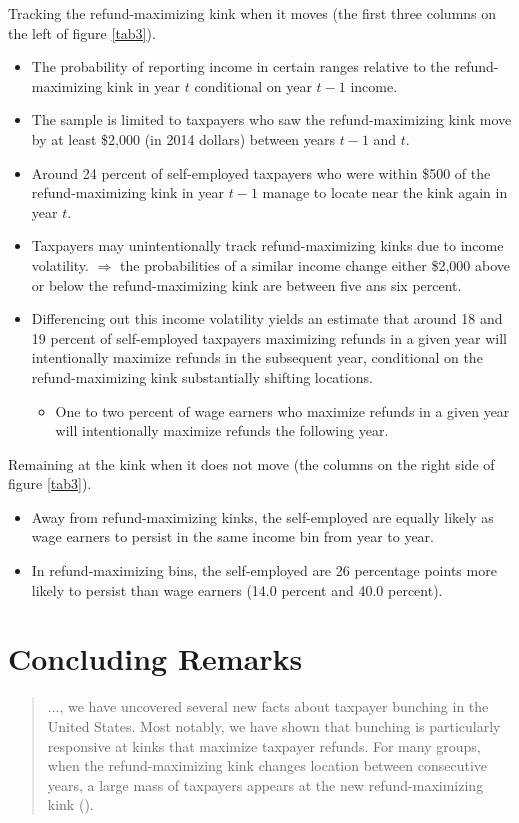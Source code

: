 \documentclass[../root]{subfiles}
\begin{document}
    \noindent
    Tracking the refund-maximizing kink when it moves
    (the first three columns on the left of figure \ref{tab3}).
    \begin{itemize}
        \item The probability of reporting income in certain ranges relative to the refund-maximizing kink in year $t$ conditional on year $t-1$ income.
        \item The sample is limited to taxpayers who saw the refund-maximizing kink move by at least \$2,000 (in 2014 dollars) between years $t-1$ and $t$.
        \item Around 24 percent of self-employed taxpayers who were within \$500 of the refund-maximizing kink in year $t-1$ manage to locate near the kink again in year $t$.
        \item Taxpayers may unintentionally track refund-maximizing kinks due to income volatility. $\Rightarrow$ the probabilities of a similar income change either \$2,000 above or below the refund-maximizing kink are between five ans six percent.
        \item Differencing out this income volatility yields an estimate that around 18 and 19 percent of self-employed taxpayers maximizing refunds in a given year will intentionally maximize refunds in the subsequent year, conditional on the refund-maximizing kink substantially shifting locations.
        \begin{itemize}
            \item One to two percent of wage earners who maximize refunds in a given year will intentionally maximize refunds the following year.
        \end{itemize}  
    \end{itemize}
    
    \noindent
    Remaining at the kink when it does not move
    (the columns on the right side of figure \ref{tab3}).
    \begin{itemize}
        \item Away from refund-maximizing kinks, the self-employed are equally likely as wage earners to persist in the same income bin from year to year.
        \item In refund-maximizing bins, the self-employed are 26 percentage points more likely to persist than wage earners (14.0 percent and 40.0 percent).
    \end{itemize}


    \section{Concluding Remarks}

    \begin{quote}
        ..., we have uncovered several new facts about taxpayer bunching in the United States. Most notably, we have shown that bunching is particularly responsive at kinks that maximize taxpayer refunds. For many groups, when the refund-maximizing kink changes location between consecutive years, a large mass of taxpayers appears at the new refund-maximizing kink (\citealp[p.19]{Mortenson}). 
    \end{quote}


    \biblio
\end{document}
